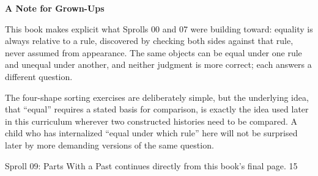 \documentclass[12pt]{book}
\newcommand{\pagenum}[1]{\vfill{\color{gray!50}\footnotesize #1}}
\newcommand{\sprollpage}{\newpage\vspace*{0.4in}}
\begin{document}
\sprollpage
\vspace*{0.3in}
{\large \textbf{A Note for Grown-Ups}}
\vspace{0.2in}

\normalsize
This book makes explicit what Sprolls 00 and 07 were building toward: equality is always relative to a rule, discovered by checking both sides against that rule, never assumed from appearance. The same objects can be equal under one rule and unequal under another, and neither judgment is more correct; each answers a different question.

\vspace{0.15in}
The four-shape sorting exercises are deliberately simple, but the underlying idea, that ``equal'' requires a stated basis for comparison, is exactly the idea used later in this curriculum wherever two constructed histories need to be compared. A child who has internalized ``equal under which rule'' here will not be surprised later by more demanding versions of the same question.

\vspace{0.3in}
{\small Sproll 09: Parts With a Past continues directly from this book's final page.}
\pagenum{15}
\end{document}
